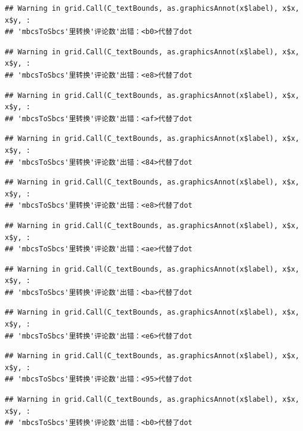 \documentclass[
]{article}
\begin{document}
\begin{verbatim}
## Warning in grid.Call(C_textBounds, as.graphicsAnnot(x$label), x$x, x$y, :
## 'mbcsToSbcs'里转换'评论数'出错：<b0>代替了dot
\end{verbatim}

\begin{verbatim}
## Warning in grid.Call(C_textBounds, as.graphicsAnnot(x$label), x$x, x$y, :
## 'mbcsToSbcs'里转换'评论数'出错：<e8>代替了dot
\end{verbatim}

\begin{verbatim}
## Warning in grid.Call(C_textBounds, as.graphicsAnnot(x$label), x$x, x$y, :
## 'mbcsToSbcs'里转换'评论数'出错：<af>代替了dot
\end{verbatim}

\begin{verbatim}
## Warning in grid.Call(C_textBounds, as.graphicsAnnot(x$label), x$x, x$y, :
## 'mbcsToSbcs'里转换'评论数'出错：<84>代替了dot
\end{verbatim}

\begin{verbatim}
## Warning in grid.Call(C_textBounds, as.graphicsAnnot(x$label), x$x, x$y, :
## 'mbcsToSbcs'里转换'评论数'出错：<e8>代替了dot
\end{verbatim}

\begin{verbatim}
## Warning in grid.Call(C_textBounds, as.graphicsAnnot(x$label), x$x, x$y, :
## 'mbcsToSbcs'里转换'评论数'出错：<ae>代替了dot
\end{verbatim}

\begin{verbatim}
## Warning in grid.Call(C_textBounds, as.graphicsAnnot(x$label), x$x, x$y, :
## 'mbcsToSbcs'里转换'评论数'出错：<ba>代替了dot
\end{verbatim}

\begin{verbatim}
## Warning in grid.Call(C_textBounds, as.graphicsAnnot(x$label), x$x, x$y, :
## 'mbcsToSbcs'里转换'评论数'出错：<e6>代替了dot
\end{verbatim}

\begin{verbatim}
## Warning in grid.Call(C_textBounds, as.graphicsAnnot(x$label), x$x, x$y, :
## 'mbcsToSbcs'里转换'评论数'出错：<95>代替了dot
\end{verbatim}

\begin{verbatim}
## Warning in grid.Call(C_textBounds, as.graphicsAnnot(x$label), x$x, x$y, :
## 'mbcsToSbcs'里转换'评论数'出错：<b0>代替了dot
\end{verbatim}
\end{document}
